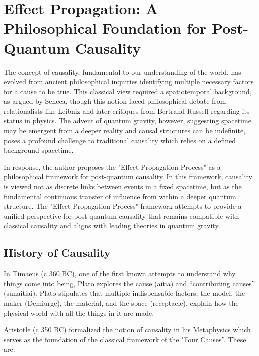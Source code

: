 \section{Effect Propagation: A Philosophical Foundation for Post-Quantum Causality}
\label{sec:causality_philosophy}

The concept of causality, fundamental to our understanding of the world, has evolved from ancient philosophical inquiries identifying multiple necessary factors for a cause to be true. This classical view required a spatiotemporal background, as argued by Seneca, though this notion faced philosophical debate from relationalists like Leibniz and later critiques from Bertrand Russell regarding its status in physics. 
The advent of quantum gravity, however, suggesting spacetime may be emergent from a deeper reality and causal structures can be indefinite, poses a profound challenge to traditional causality which relies on a defined background spacetime. 


In response, the author proposes the "Effect Propagation Process" as a philosophical framework for post-quantum causality. In this framework, causality is viewed not as discrete links between events in a fixed spacetime, but as the fundamental continuous transfer of influence from within a deeper quantum structure. 
The "Effect Propagation Process" framework attempts to 
provide a unified perspective for post-quantum causality that remains compatible with classical causality and aligns with leading theories in quantum gravity. 

\subsection{History of Causality}

In Timaeus (c 360 BC), one of the first known attempts to understand why things come into being, Plato explores the cause (aitia) and “contributing causes” (sunaitiai). Plato stipulates that multiple indispensable factors, the model, the maker (Demiurge), the material, and the space (receptacle), explain how the physical world with all the things in it are made\cite{SEP_Timaeus}.

Aristotle (c 350 BC) formalized the notion of causality in his Metaphysics\cite{SEP_Metaphysics}  which serves as the foundation of the classical framework of the "Four Causes”\cite{SEP_AristotleCausality}. These are:

